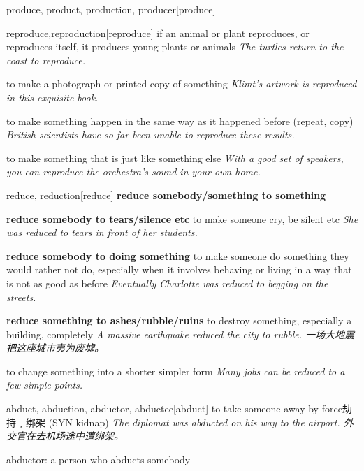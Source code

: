 \begin{DefWord}{produce, product, production, producer}[produce]
\end{DefWord}

\begin{DefWord}{reproduce,reproduction}[reproduce]
    if an animal or plant reproduces, or reproduces itself, it produces young plants or animals
    \textit{The turtles return to the coast to reproduce.}

    to make a photograph or printed copy of something
    \textit{Klimt’s artwork is reproduced in this exquisite book.}

    to make something happen in the same way as it happened before (repeat, copy)
    \textit{British scientists have so far been unable to reproduce these results.}

    to make something that is just like something else
    \textit{With a good set of speakers, you can reproduce the orchestra’s sound in your own home.}
\end{DefWord}

\begin{DefWord}{reduce, reduction}[reduce]
    \textbf{reduce somebody/something to something}

    \textbf{reduce somebody to tears/silence etc} to make someone cry, be silent etc
    \textit{She was reduced to tears in front of her students.}

    \textbf{reduce somebody to doing something} to make someone do something they would rather not do, especially when it involves behaving or living in a way that is not as good as before
    \textit{Eventually Charlotte was reduced to begging on the streets.}

    \textbf{reduce something to ashes/rubble/ruins}
    to destroy something, especially a building, completely
    \textit{A massive earthquake reduced the city to rubble. 一场大地震把这座城市夷为废墟。}

    to change something into a shorter simpler form
    \textit{Many jobs can be reduced to a few simple points.}
\end{DefWord}

\begin{DefWord}{abduct, abduction, abductor, abductee}[abduct]
    to take someone away by force劫持﹐绑架 (SYN  kidnap)
    \textit{The diplomat was abducted on his way to the airport.  外交官在去机场途中遭绑架。}

    abductor: a person who abducts somebody
\end{DefWord}

